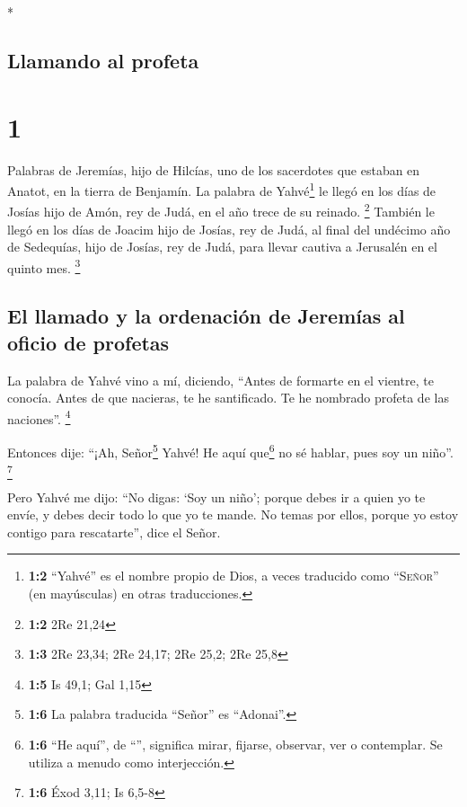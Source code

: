 \begin{paracol}{2} \switchcolumn[0]*

\hypertarget{llamando-al-profeta}{%
\subsection{Llamando al profeta}\label{llamando-al-profeta}}

\hypertarget{section}{%
\section{1}\label{section}}

 Palabras de Jeremías, hijo de Hilcías, uno de los
sacerdotes que estaban en Anatot, en la tierra de Benjamín.
 La palabra de Yahvé\footnote{\textbf{1:2} ``Yahvé'' es el
  nombre propio de Dios, a veces traducido como ``\textsc{Señor}'' (en
  mayúsculas) en otras traducciones.} le llegó en los días de Josías
hijo de Amón, rey de Judá, en el año trece de su reinado. \footnote{\textbf{1:2}
  2Re 21,24}  También le llegó en los días de Joacim hijo
de Josías, rey de Judá, al final del undécimo año de Sedequías, hijo de
Josías, rey de Judá, para llevar cautiva a Jerusalén en el quinto mes.
\footnote{\textbf{1:3} 2Re 23,34; 2Re 24,17; 2Re 25,2; 2Re 25,8}

\hypertarget{el-llamado-y-la-ordenaciuxf3n-de-jeremuxedas-al-oficio-de-profetas}{%
\subsection{El llamado y la ordenación de Jeremías al oficio de
profetas}\label{el-llamado-y-la-ordenaciuxf3n-de-jeremuxedas-al-oficio-de-profetas}}

 La palabra de Yahvé vino a mí, diciendo, 
``Antes de formarte en el vientre, te conocía. Antes de que nacieras, te
he santificado. Te he nombrado profeta de las naciones''. \footnote{\textbf{1:5}
  Is 49,1; Gal 1,15}

 Entonces dije: ``¡Ah, Señor\footnote{\textbf{1:6} La
  palabra traducida ``Señor'' es ``Adonai''.} Yahvé! He aquí
que\footnote{\textbf{1:6} ``He aquí'', de ``'', significa
  mirar, fijarse, observar, ver o contemplar. Se utiliza a menudo como
  interjección.} no sé hablar, pues soy un niño''. \footnote{\textbf{1:6}
  Éxod 3,11; Is 6,5-8}

 Pero Yahvé me dijo: ``No digas: `Soy un niño'; porque
debes ir a quien yo te envíe, y debes decir todo lo que yo te mande.
 No temas por ellos, porque yo estoy contigo para
rescatarte'', dice el Señor.


\end{paracol}
